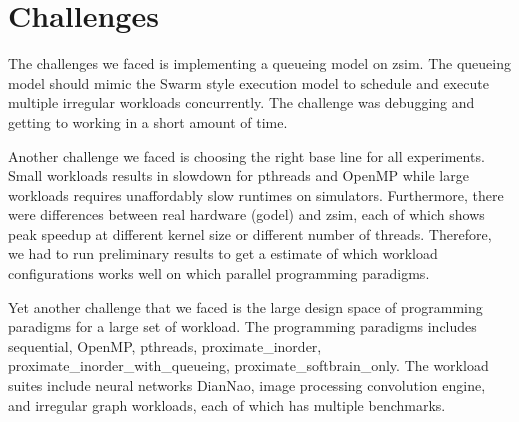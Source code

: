 \section{Challenges} \label{sec:chal}
The challenges we faced is implementing a queueing model on zsim. 
The queueing model should mimic the Swarm style execution model 
to schedule and execute multiple irregular workloads concurrently. 
The challenge was debugging and getting to working in a short amount of time. 

Another challenge we faced is choosing the right base line for all 
experiments. Small workloads results in slowdown for pthreads and 
OpenMP while large workloads requires unaffordably slow runtimes on simulators. 
Furthermore, there were differences between real hardware (godel) and zsim, 
each of which shows peak speedup at different kernel size or different number of threads. 
Therefore, we had to run preliminary results to get a estimate of which workload 
configurations works well on which parallel programming paradigms.

Yet another challenge that we faced is the large design space of 
programming paradigms for a large set of workload. The programming 
paradigms includes sequential, OpenMP, pthreads, proximate_inorder, 
proximate_inorder_with_queueing, proximate_softbrain_only. The workload suites include
neural networks DianNao, image processing convolution engine, and 
irregular graph workloads, each of which has multiple benchmarks. 